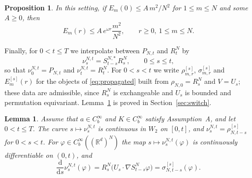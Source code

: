 \documentclass[11pt]{amsart}
\numberwithin{equation}{section}
\theoremstyle{plain}
\newtheorem{proposition}[theorem]{Proposition}
\newtheorem{lemma}[theorem]{Lemma}
\theoremstyle{remark}
\newcommand{\R}{\mathbb{R}}
\newcommand{\W}{W_2}
\newcommand{\dd}{\mathrm{d}}
\begin{document}
\begin{proposition}\label{prop:profile}
In this setting, if $E_m(0)\le A\,m^2/N^2$ for $1\le m\le N$ and some $A\ge0$, then
\[
E_m(r)\le A\,e^{\omega r}\frac{m^2}{N^2},\qquad r\ge0,\ 1\le m\le N.
\]
\end{proposition}

Finally, for $0<t\le T$ we interpolate between $P_{N,t}$ and $R^N_t$ by
\begin{equation}\label{eq:switch}
\nu^{N,t}_s=S^{N,*}_{t-s}R^N_s,\qquad 0\le s\le t,
\end{equation}
so that $\nu^{N,t}_0=P_{N,t}$ and $\nu^{N,t}_t=R^N_t$. For $0<s<t$ we write $\rho^{[s]}_{m,r}$, $\sigma^{[s]}_{m,r}$ and $E^{[s]}_m(r)$ for the objects of \eqref{eq:propagated} built from $\rho_{N,0}=R^N_s$ and $V=U_s$; these data are admissible, since $R^N_s$ is exchangeable and $U_s$ is bounded and permutation equivariant. Lemma~\ref{lem:switch} is proved in Section~\ref{sec:switch}.

\begin{lemma}\label{lem:switch}
Assume that $a\in C^\infty_b$ and $K\in C^\infty_b$ satisfy Assumption~A, and let $0<t\le T$. The curve $s\mapsto\nu^{N,t}_s$ is continuous in $\W$ on $[0,t]$, and $\nu^{N,t}_s=\rho^{[s]}_{N,t-s}$ for $0<s<t$. For $\varphi\in C^\infty_b((\R^d)^N)$ the map $s\mapsto\nu^{N,t}_s(\varphi)$ is continuously differentiable on $(0,t)$, and
\begin{equation}\label{eq:switch-derivative}
\frac{\dd}{\dd s}\nu^{N,t}_s(\varphi)=R^N_s\big(U_s\cdot\nabla S^N_{t-s}\varphi\big)=\sigma^{[s]}_{N,t-s}(\varphi).
\end{equation}
\end{lemma}
\end{document}
